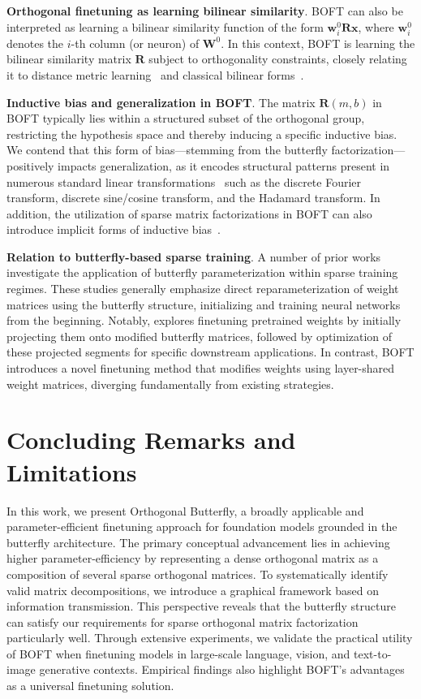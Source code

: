 \textbf{Orthogonal finetuning as learning bilinear similarity}. BOFT can also be interpreted as learning a bilinear similarity function of the form $\bm{w}^0_i\bm{R}\bm{x}$, where $\bm{w}^0_i$ denotes the $i$-th column (or neuron) of $\bm{W}^0$. In this context, BOFT is learning the bilinear similarity matrix $\bm{R}$ subject to orthogonality constraints, closely relating it to distance metric learning~\cite{xing2002distance} and classical bilinear forms~\cite{roman2005advanced}.

\textbf{Inductive bias and generalization in BOFT}. The matrix $\bm{R}(m,b)$ in BOFT typically lies within a structured subset of the orthogonal group, restricting the hypothesis space and thereby inducing a specific inductive bias. We contend that this form of bias—stemming from the butterfly factorization—positively impacts generalization, as it encodes structural patterns present in numerous standard linear transformations~\cite{dao2019kaleidoscope} such as the discrete Fourier transform, discrete sine/cosine transform, and the Hadamard transform. In addition, the utilization of sparse matrix factorizations in BOFT can also introduce implicit forms of inductive bias~\cite{gunasekar2017implicit,li2018algorithmic,liu2019neural}.

\textbf{Relation to butterfly-based sparse training}. A number of prior works~\cite{dao2019learning,dao2019kaleidoscope,chen2022pixelated,dao2022monarch} investigate the application of butterfly parameterization within sparse training regimes. These studies generally emphasize direct reparameterization of weight matrices using the butterfly structure, initializing and training neural networks from the beginning. Notably, \cite{dao2022monarch} explores finetuning pretrained weights by initially projecting them onto modified butterfly matrices, followed by optimization of these projected segments for specific downstream applications. In contrast, BOFT introduces a novel finetuning method that modifies weights using layer-shared weight matrices, diverging fundamentally from existing strategies.



\section{Concluding Remarks and Limitations}

In this work, we present Orthogonal Butterfly, a broadly applicable and parameter-efficient finetuning approach for foundation models grounded in the butterfly architecture. The primary conceptual advancement lies in achieving higher parameter-efficiency by representing a dense orthogonal matrix as a composition of several sparse orthogonal matrices. To systematically identify valid matrix decompositions, we introduce a graphical framework based on information transmission. This perspective reveals that the butterfly structure can satisfy our requirements for sparse orthogonal matrix factorization particularly well. Through extensive experiments, we validate the practical utility of BOFT when finetuning models in large-scale language, vision, and text-to-image generative contexts. Empirical findings also highlight BOFT's advantages as a universal finetuning solution.

